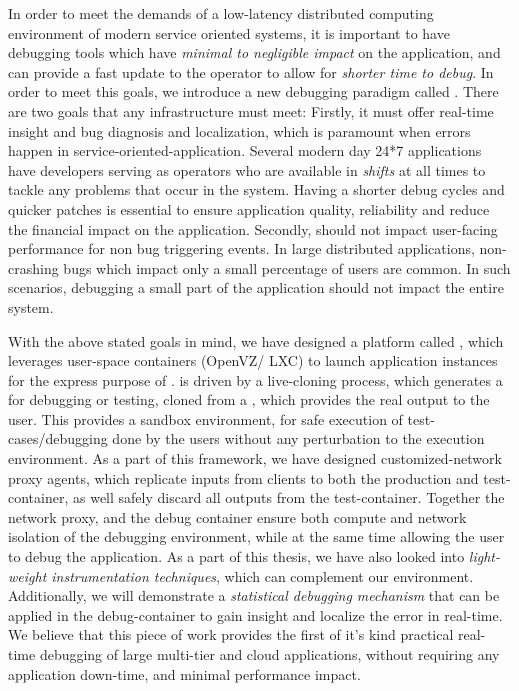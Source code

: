 In order to meet the demands of a low-latency distributed computing environment of modern service oriented systems, it is important to have debugging tools which have \textit{minimal to negligible impact} on the application, and can provide a fast update to the operator to allow for \textit{shorter time to debug}.
In order to meet this goals, we introduce a new debugging paradigm called \livedebugging.
There are two goals that any \livedebugging infrastructure must meet:
Firstly, it must offer real-time insight and bug diagnosis and localization, which is paramount when errors happen in service-oriented-application. 
Several modern day 24*7 applications have developers serving as operators who are available in \textit{shifts} at all times to tackle any problems that occur in the system.
Having a shorter debug cycles and quicker patches is essential to ensure application quality, reliability and reduce the financial impact on the application.
Secondly, \livedebugging should not impact user-facing performance for non bug triggering events.
In large distributed applications, non-crashing bugs which impact only a small percentage of users are common. 
In such scenarios, debugging a small part of the application should not impact the entire system.

With the above stated goals in mind, we have designed a platform called \parikshan, which leverages user-space containers (OpenVZ/ LXC) to launch application instances for the express purpose of \livedebugging. 
\parikshan is driven by a  live-cloning process, which generates a \debugcontainer for debugging or testing, cloned from a \productioncontainer, which provides the real output to the user.
This \debugcontainer provides a sandbox environment, for safe execution of test-cases/debugging done by the users without any perturbation to the execution environment.
As a part of this framework, we have designed customized-network proxy agents, which replicate inputs from clients to both the production and test-container, as well safely discard all outputs from the test-container.
Together the network proxy, and the debug container ensure both compute and network isolation of the debugging environment, while at the same time allowing the user to debug the application.
As a part of this thesis, we have also looked into \textit{light-weight instrumentation techniques}, which can complement our \livedebugging environment.
Additionally, we will demonstrate a \textit{statistical debugging mechanism} that can be applied in the debug-container to gain insight and localize the error in real-time. 
We believe that this piece of work provides the first of it's kind practical real-time debugging of large multi-tier and cloud applications, without requiring any application down-time, and minimal performance impact.


